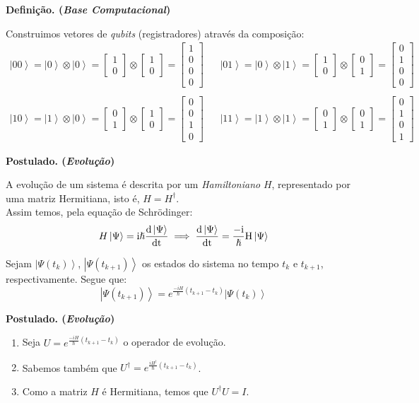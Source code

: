 \documentclass[t]{beamer}
\newcommand{\ii}{
	\rm{i}
}
\newcommand{\postulado}[1]{%
	\textbf{Postulado. (\emph{#1})\\}
}
\newcommand{\definicao}[1]{%
	\textbf{Definição. (\emph{#1})\\}
}
\newcommand{\vetor}[2]{\ensuremath{
\left[\begin{matrix}
#1 \\
#2
\end{matrix}\right]
}
}
\newcommand{\vetorx}[4]{\ensuremath{
\left[\begin{matrix}
#1 \\
#2 \\
#3 \\
#4
\end{matrix}\right]
}
}
\newcommand{\ket}[1]{\ensuremath{\left|#1\right\rangle}}
\begin{document}
	\begin{frame}{\subsecname}
		\definicao{Base Computacional}
		Construimos vetores de \textit{qubits} (registradores) através da composição:
		\footnotesize
		\begin{align*}
		\ket{00} = \ket{0} \otimes \ket{0} = \vetor{1}{0} \otimes \vetor{1}{0} = \vetorx{1}{0}{0}{0} &&
		\ket{01} = \ket{0} \otimes \ket{1} = \vetor{1}{0} \otimes \vetor{0}{1} = \vetorx{0}{1}{0}{0} \\
		~\\
		\ket{10} = \ket{1} \otimes \ket{0} = \vetor{0}{1} \otimes \vetor{1}{0} = \vetorx{0}{0}{1}{0} &&
		\ket{11} = \ket{1} \otimes \ket{1} = \vetor{0}{1} \otimes \vetor{0}{1} = \vetorx{0}{1}{0}{1}
		\end{align*}
		\normalsize
	\end{frame}
	
	\begin{frame}{\subsecname}
		\postulado{Evolução}
		A evolução de um sistema é descrita por um \textit{Hamiltoniano} $H$, representado por uma matriz Hermitiana, isto é, $H = H^{\dagger}$.\\
		
		Assim temos, pela equação de Schrödinger:
		$$H \ket{\Psi} =\ii \hslash \frac{d \ket{\Psi}}{dt} \implies \frac{d \ket{\Psi}}{dt} = \frac{-\ii}{\hslash} H \ket{\Psi}$$
		
		Sejam $\ket{\Psi(t_k)}$, $\ket{\Psi(t_{k+1})}$ os estados do sistema no tempo $t_k$ e $t_{k+1}$, respectivamente. Segue que:
		$$\ket{\Psi(t_{k+1})} = e^{\frac{-i H}{\hslash} (t_{k+1} - t_k)} \ket{\Psi(t_k)}$$
	\end{frame}
	
	\begin{frame}{\subsecname}
		\postulado{Evolução}
		\begin{enumerate}
			\item<1-> Seja $U = e^{\frac{-i H}{\hslash} (t_{k+1} - t_k)}$ o operador de evolução.
			\item<2-> Sabemos também que $U^{\dagger} = e^{\frac{i H^{\dagger}}{\hslash} (t_{k+1} - t_k)}$.
			\item<3-> Como a matriz $H$ é Hermitiana, temos que $U^{\dagger} U = I$.
		\end{enumerate}
		
	 \bigskip

	\vspace{1 cm}
	
	
	\end{frame}
	
\end{document}
